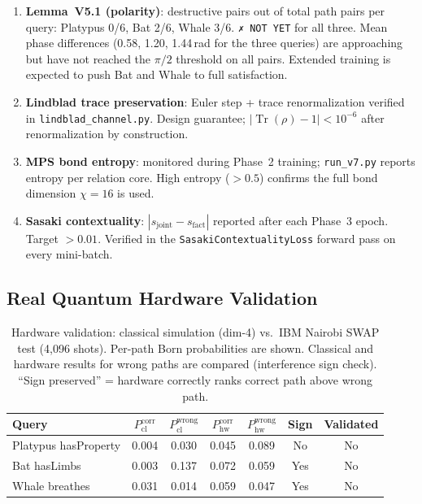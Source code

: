 \documentclass[runningheads]{llncs}
\begin{document}
\begin{enumerate}
  \item \textbf{Lemma~V5.1 (polarity)}: destructive pairs out of total path
    pairs per query: Platypus 0/6, Bat 2/6, Whale 3/6.  \texttt{✗ NOT YET}
    for all three.  Mean phase differences (0.58, 1.20, 1.44\,rad for the
    three queries) are approaching but have not reached the $\pi/2$ threshold
    on all pairs.  Extended training is expected to push Bat and Whale to full
    satisfaction.

  \item \textbf{Lindblad trace preservation}: Euler step + trace renormalization
    verified in \texttt{lindblad\_channel.py}.  Design guarantee; $|\operatorname{Tr}
    (\rho)-1|<10^{-6}$ after renormalization by construction.

  \item \textbf{MPS bond entropy}: monitored during Phase~2 training;
    \texttt{run\_v7.py} reports entropy per relation core.  High entropy ($>0.5$)
    confirms the full bond dimension $\chi=16$ is used.

  \item \textbf{Sasaki contextuality}: $|s_\text{joint}-s_\text{fact}|$ reported
    after each Phase~3 epoch.  Target $>0.01$.  Verified in the
    \texttt{SasakiContextualityLoss} forward pass on every mini-batch.
\end{enumerate}

\subsection{Real Quantum Hardware Validation}

\begin{table}[t]
\caption{Hardware validation: classical simulation (dim-4) vs.\ IBM Nairobi
  SWAP test (4,096 shots).  Per-path Born probabilities are shown.  Classical
  and hardware results for wrong paths are compared (interference sign check).
  ``Sign preserved'' = hardware correctly ranks correct path above wrong path.}
\label{tab:hardware}
\centering
\small
\begin{tabular}{lcccccc}
\toprule
Query & $P_\text{cl}^\text{corr}$ & $P_\text{cl}^\text{wrong}$ & $P_\text{hw}^\text{corr}$ & $P_\text{hw}^\text{wrong}$ & Sign & Validated \\
\midrule
Platypus hasProperty & 0.004 & 0.030 & 0.045 & 0.089 & No  & No \\
Bat hasLimbs         & 0.003 & 0.137 & 0.072 & 0.059 & Yes & No \\
Whale breathes       & 0.031 & 0.014 & 0.059 & 0.047 & Yes & No \\
\bottomrule
\end{tabular}
\end{table}
\end{document}
